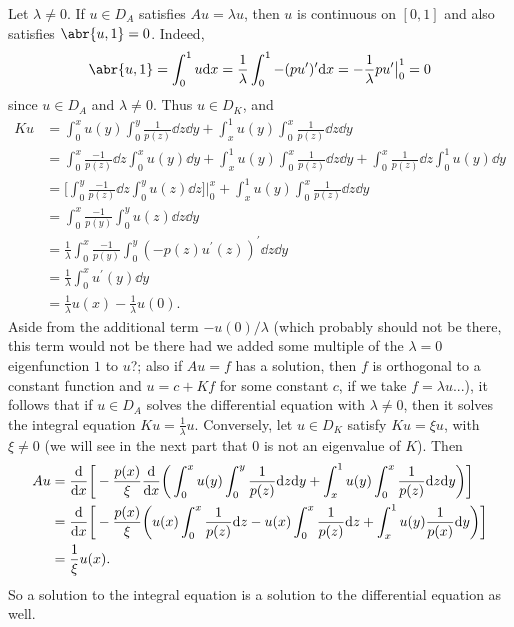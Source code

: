 \documentclass[11pt]{article}
\begin{document}
\begin{enumerate}[label=\textbf{\arabic*.}]
\begin{enumerate}[label=\textsf{(\roman*)}]
        Let $\lambda \neq 0$. If $u\in D_A$ satisfies $Au = \lambda u$, then $u$ is continuous on $[0,1]$ and also satisfies $\abr{u,1} = 0$. Indeed,
        \[\abr{u,1} = \int_0^1 u\dd x = \frac{1}{\lambda}\int_0^1-(pu^\prime)^\prime \dd x = -\frac{1}{\lambda}pu^\prime\big|_0^1 = 0\]
        since $u\in D_A$ and $\lambda\neq 0$. Thus $u\in D_K$, and 
        \begin{align*}
            Ku &= \int_0^x u(y) \int_0^y \frac{1}{p(z)}\dd z \dd y  + \int_x^1 u(y)\int_0^x \frac{1}{p(z)}\dd z\dd y\\
            &=\int_0^x \frac{-1}{p(z)}\dd{z}\int_0^xu(y)\dd y + \int_x^1 u(y)\int_0^x \frac{1}{p(z)}\dd z\dd y + \int_0^x \frac{1}{p(z)}\dd z\int_0^1 u(y)\dd y\\
            &= \bigg[\int_0^y \frac{-1}{p(z)}\dd{z}\int_0^yu(z)\dd z\bigg]\bigg|_0^x + \int_x^1 u(y)\int_0^x \frac{1}{p(z)}\dd z\dd y\\
            &= \int_0^x \frac{-1}{p(y)}\int_0^y u(z) \dd z \dd y\\
            &= \frac{1}{\lambda}\int_0^x \frac{-1}{p(y)}\int_0^y (-p(z)u^\prime(z))^\prime \dd z \dd y\\
            &= \frac{1}{\lambda}\int_0^x u^\prime(y)\dd y\\
            &= \frac{1}{\lambda}u(x) - \frac{1}{\lambda}u(0).
        \end{align*}
        Aside from the additional term $-u(0)/\lambda$ (which probably should not be there, this term would not be there had we added some multiple of the $\lambda = 0$ eigenfunction $1$ to $u$?; also if $Au = f$ has a solution, then $f$ is orthogonal to a constant function and $u = c + Kf$ for some constant $c$, if we take $f = \lambda u$...), it follows that if $u\in D_A$ solves the differential equation with $\lambda\neq 0$, then it solves the integral equation $Ku = \frac{1}{\lambda}u$. Conversely, let $u\in D_K$ satisfy $Ku = \xi u$, with $\xi\neq 0$ (we will see in the next part that $0$ is not an eigenvalue of $K$). Then
        \begin{align*}
            Au &= \dv{x}\bigg[-\frac{p(x)}{\xi}\dv{x}\bigg(\int_0^x u(y) \int_0^y \frac{1}{p(z)}\dd z \dd y  + \int_x^1 u(y)\int_0^x \frac{1}{p(z)}\dd z\dd y\bigg)\bigg]\\
            &= \dv x \bigg[-\frac{p(x)}{\xi} \bigg(u(x)\int_0^x \frac{1}{p(z)}\dd z - u(x)\int_0^x \frac{1}{p(z)}\dd z + \int_x^1 u(y) \frac{1}{p(x)}\dd y\bigg)\bigg]\\
            &= \frac{1}{\xi}u(x).
        \end{align*}
        So a solution to the integral equation is a solution to the differential equation as well.


\end{enumerate}
\end{enumerate}
\end{document}
